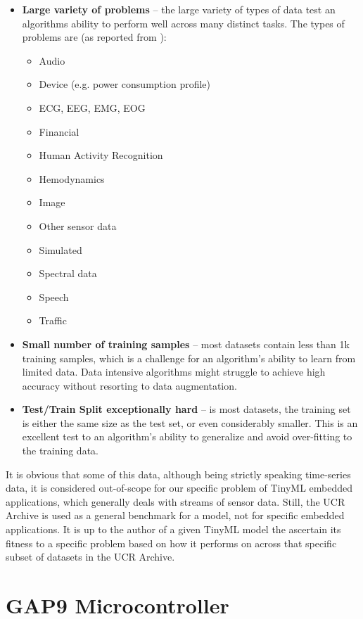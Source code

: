 \begin{itemize}
    \item \textbf{Large variety of problems} -- the large variety of types of data test an algorithms ability to perform well across many distinct tasks. The types of problems are (as reported from \cite{UCRArchive2018}):
        \begin{itemize}
            \item Audio
            \item Device (e.g. power consumption profile)
            \item ECG, EEG, EMG, EOG
            \item Financial
            \item Human Activity Recognition
            \item Hemodynamics
            \item Image
            \item Other sensor data
            \item Simulated
            \item Spectral data
            \item Speech
            \item Traffic
        \end{itemize}
    \item \textbf{Small number of training samples} -- most datasets contain less than 1k training samples, which is a challenge for an algorithm's ability to learn from limited data. Data intensive algorithms might struggle to achieve high accuracy without resorting to data augmentation.
    \item \textbf{Test/Train Split exceptionally hard} -- is most datasets, the training set is either the same size as the test set, or even considerably smaller. This is an excellent test to an algorithm's ability to generalize and avoid over-fitting to the training data.
\end{itemize}
It is obvious that some of this data, although being strictly speaking time-series data, it is considered out-of-scope for our specific problem of TinyML embedded applications, which generally deals with streams of sensor data. Still, the UCR Archive is used as a general benchmark for a model, not for specific embedded applications.
It is up to the author of a given TinyML model the ascertain its fitness to a specific problem based on how it performs on across that specific subset of datasets in the UCR Archive.

\section{GAP9 Microcontroller}

